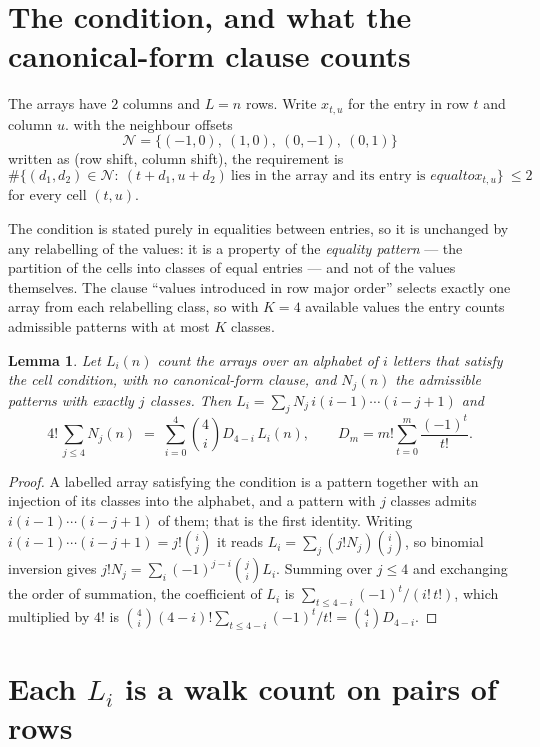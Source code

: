 \documentclass[11pt,a4paper]{article}
\theoremstyle{plain}
\newtheorem{lemma}[theorem]{Lemma}
\theoremstyle{definition}
\begin{document}
\section{The condition, and what the canonical-form clause counts}

The arrays have $2$ columns and $L=n$ rows. Write $x_{t,u}$ for the entry in
row $t$ and column $u$. with the neighbour offsets
\[
\mathcal N=\{(-1,0),\ (1,0),\ (0,-1),\ (0,1)\}
\]
written as (row shift, column shift), the requirement is
\begin{equation}\label{eq:loc}
\#\bigl\{(d_1,d_2)\in\mathcal N:\ (t+d_1,u+d_2)\ \text{lies in the array and its entry is }
equal to x_{t,u}\bigr\}\ \le2
\end{equation}
for every cell $(t,u)$.

The condition is stated purely in equalities between entries, so it is unchanged by any
relabelling of the values: it is a property of the \emph{equality pattern} --- the partition
of the cells into classes of equal entries --- and not of the values themselves. The clause
``values introduced in row major order'' selects exactly one array from each relabelling
class, so with $K=4$ available values the entry counts admissible patterns with at most $K$
classes.

\begin{lemma}\label{lem:inv}
Let $L_i(n)$ count the arrays over an alphabet of $i$ letters that satisfy the cell
condition, with no canonical-form clause, and $N_j(n)$ the admissible patterns with exactly
$j$ classes. Then $L_i=\sum_j N_j\,i(i-1)\cdots(i-j+1)$ and
\[
4!\,\sum_{j\le 4}N_j(n)\;=\;\sum_{i=0}^{4}\binom{4}{i}D_{4-i}\,L_i(n),
\qquad D_m=m!\sum_{t=0}^{m}\frac{(-1)^t}{t!} .
\]
\end{lemma}

\begin{proof}
A labelled array satisfying the condition is a pattern together with an injection of its
classes into the alphabet, and a pattern with $j$ classes admits $i(i-1)\cdots(i-j+1)$ of
them; that is the first identity. Writing $i(i-1)\cdots(i-j+1)=j!\binom{i}{j}$ it reads
$L_i=\sum_j(j!N_j)\binom{i}{j}$, so binomial inversion gives
$j!N_j=\sum_i(-1)^{j-i}\binom{j}{i}L_i$. Summing over $j\le4$ and exchanging the
order of summation, the coefficient of $L_i$ is
$\sum_{t\le4-i}(-1)^t/(i!\,t!)$, which multiplied by $4!$ is
$\binom{4}{i}(4-i)!\sum_{t\le4-i}(-1)^t/t!=\binom{4}{i}D_{4-i}$.
\end{proof}

\section{Each $L_i$ is a walk count on pairs of rows}
\end{document}
